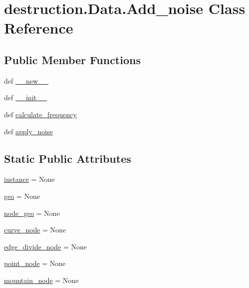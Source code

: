 \hypertarget{classdestruction_1_1_data_1_1_add__noise}{\section{destruction.\-Data.\-Add\-\_\-noise Class Reference}
\label{classdestruction_1_1_data_1_1_add__noise}
}
\subsection*{Public Member Functions}
\begin{DoxyCompactItemize}
\item 
def \hyperlink{classdestruction_1_1_data_1_1_add__noise_a9271db3be1ed903254943c6950788aa2}{\-\_\-\-\_\-new\-\_\-\-\_\-}
\item 
def \hyperlink{classdestruction_1_1_data_1_1_add__noise_a2e0d36e7be59f1b9a131b8ae95d227a7}{\-\_\-\-\_\-init\-\_\-\-\_\-}
\item 
def \hyperlink{classdestruction_1_1_data_1_1_add__noise_aa7be8d26d5e6d8d639b5e705629db299}{calculate\-\_\-frequency}
\item 
def \hyperlink{classdestruction_1_1_data_1_1_add__noise_a1640b0663133d836105337154f7534d3}{apply\-\_\-noise}
\end{DoxyCompactItemize}
\subsection*{Static Public Attributes}
\begin{DoxyCompactItemize}
\item 
\hyperlink{classdestruction_1_1_data_1_1_add__noise_a584c8f91746ca2c78c8012a64e55a5f2}{instance} = None
\item 
\hyperlink{classdestruction_1_1_data_1_1_add__noise_a60f371de6a922b73b765f7741e400cad}{geo} = None
\item 
\hyperlink{classdestruction_1_1_data_1_1_add__noise_a4791d030d95e0fdb1c15e2f2a4ed797f}{node\-\_\-geo} = None
\item 
\hyperlink{classdestruction_1_1_data_1_1_add__noise_a53686d76e069336930e2eb03dbc0d8f8}{curve\-\_\-node} = None
\item 
\hyperlink{classdestruction_1_1_data_1_1_add__noise_a27c260c63c65e4cfddaccd89d53b3542}{edge\-\_\-divide\-\_\-node} = None
\item 
\hyperlink{classdestruction_1_1_data_1_1_add__noise_a048fb2cc30650b886e4015985f8b58d7}{point\-\_\-node} = None
\item 
\hyperlink{classdestruction_1_1_data_1_1_add__noise_a218b044f989f4ad5ccc321c3c40538ed}{mountain\-\_\-node} = None
\end{DoxyCompactItemize}


